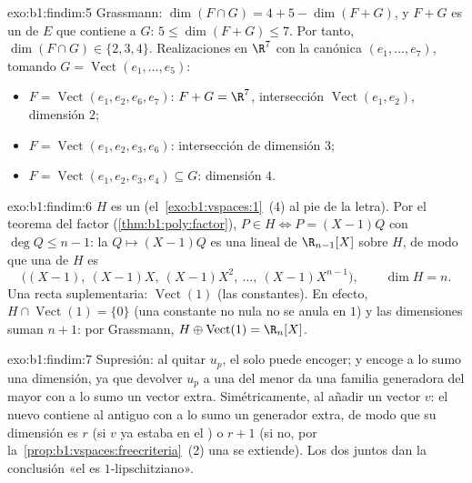 \begin{solution}{exo:b1:findim:5}
Grassmann: $\dim(F \cap G) = 4 + 5 - \dim(F + G)$, y $F + G$ es un
 de $E$ que contiene a $G$: $5 \leq \dim(F+G) \leq 7$. Por
tanto, $\dim(F \cap G) \in \{2, 3, 4\}$. Realizaciones en $\R^7$ con
la  canónica $(e_1, \dots, e_7)$, tomando
$G = \operatorname{Vect}(e_1, \dots, e_5)$:
\begin{itemize}
  \item $F = \operatorname{Vect}(e_1, e_2, e_6, e_7)$: $F + G = \R^7$,
        intersección $\operatorname{Vect}(e_1, e_2)$, dimensión $2$;
  \item $F = \operatorname{Vect}(e_1, e_2, e_3, e_6)$: intersección
        de dimensión $3$;
  \item $F = \operatorname{Vect}(e_1, e_2, e_3, e_4) \subseteq G$:
        dimensión $4$.
\end{itemize}
\end{solution}

\begin{solution}{exo:b1:findim:6}
$H$ es un  (el~\cref{exo:b1:vspaces:1}~(4) al pie de la
letra). Por el teorema del factor (\cref{thm:b1:poly:factor}),
$P \in H \iff P = (X-1)Q$ con $\deg Q \leq n - 1$: la 
$Q \mapsto (X-1)Q$ es una  lineal de $\R_{n-1}[X]$ sobre
$H$, de modo que una  de $H$ es
\[
\bigl((X-1),\ (X-1)X,\ (X-1)X^2,\ \dots,\ (X-1)X^{n-1}\bigr),
\qquad \dim H = n .
\]
Una recta suplementaria: $\operatorname{Vect}(1)$ (las constantes).
En efecto, $H \cap \operatorname{Vect}(1) = \{0\}$ (una constante no
nula no se anula en $1$) y las dimensiones suman $n + 1$: por
Grassmann, $H \oplus \operatorname{Vect}(1) = \R_n[X]$.
\end{solution}

\begin{solution}{exo:b1:findim:7}
Supresión: al quitar $u_p$, el  solo puede
encoger; y encoge a lo sumo una dimensión, ya que devolver $u_p$ a
una  del  menor da una familia generadora
del mayor con a lo sumo un vector extra. Simétricamente, al añadir un
vector $v$: el nuevo  contiene al antiguo con a lo
sumo un generador extra, de modo que su dimensión es $r$ (si $v$ ya
estaba en el ) o $r + 1$ (si no, por
la~\cref{prop:b1:vspaces:freecriteria}~(2) una  se extiende). Los
dos  juntos dan la conclusión «el  es
$1$-lipschitziano».
\end{solution}

